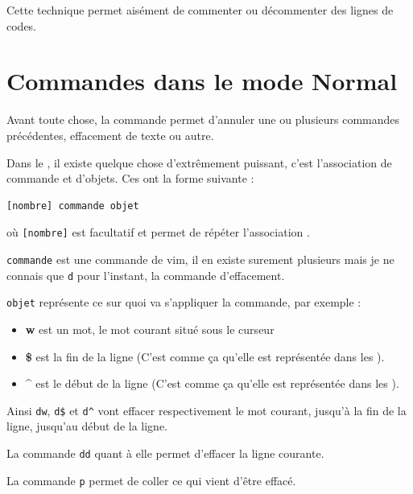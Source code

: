 \documentclass[a4paper,twoside]{article}
\begin{document}
\begin{remarque}
Cette technique permet aisément de commenter ou décommenter des lignes de codes.
\end{remarque}



\section{Commandes dans le mode Normal}
Avant toute chose, la commande  permet d'annuler une ou plusieurs commandes précédentes, effacement de texte ou autre.

\bigskip

Dans le , il existe quelque chose d'extrêmement puissant, c'est l'association de commande et d'objets. Ces  ont la forme suivante :
\begin{verbatim}
[nombre] commande objet
\end{verbatim}
où \verb|[nombre]| est facultatif et permet de répéter l'association .

\texttt{commande} est une commande de vim, il en existe surement plusieurs mais je ne connais que \texttt{d} pour l'instant, la commande d'effacement.

\texttt{objet} représente ce sur quoi va s'appliquer la commande, par exemple :
\begin{itemize}
\item\textbf{w} est un mot, le mot courant situé sous le curseur
\item\textbf{\$} est la fin de la ligne (C'est comme ça qu'elle est représentée dans les ).
\item\textbf{\^} est le début de la ligne (C'est comme ça qu'elle est représentée dans les ).
\end{itemize}

Ainsi \texttt{dw}, \texttt{d\$} et \texttt{d\^} vont effacer respectivement le mot courant, jusqu'à la fin de la ligne, jusqu'au début de la ligne.

La commande \texttt{dd} quant à elle permet d'effacer la ligne courante.

\begin{remarque}
La commande \texttt{p} permet de coller ce qui vient d'être effacé.
\end{remarque}


\bigskip
\end{document}
